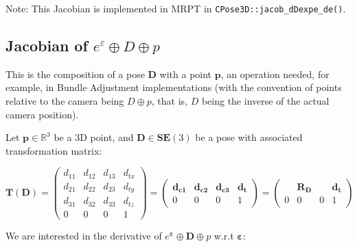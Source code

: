 \documentclass[a4paper,11pt]{report}
\newcommand{\E}{{\bm{\varepsilon}}}
\begin{document}
Note: This Jacobian is implemented in MRPT in \texttt{CPose3D::jacob\_dDexpe\_de()}.


\subsection{Jacobian of $e^\varepsilon \oplus D \oplus p$}
\label{sect:jacob_eDp}

This is the composition of a pose $\mathbf{D}$ with a point $\mathbf{p}$,
an operation needed, for example, in Bundle Adjustment implementations \cite{triggs2000bundle}
(with the convention of points relative to the camera being $D \oplus p$, that is,
$D$ being the inverse of the actual camera position).

Let $\mathbf{p} \in \mathbb{R}^3$ be a 3D point, and
$\mathbf{D} \in \mathbf{SE}(3)$ be a pose with associated transformation matrix:

\begin{equation}
\mathbf{T}(\mathbf{D}) =
\left(
\begin{array}{ccc|c}
 d_{11} & d_{12} & d_{13} & d_{tx}   \\
 d_{21} & d_{22} & d_{23} & d_{ty}   \\
 d_{31} & d_{32} & d_{33} & d_{tz}   \\
\hline
  0 & 0 & 0 & 1
\end{array}
\right)
=
\left(
\begin{array}{ccc|c}
 \mathbf{d_{c1}}  & \mathbf{d_{c2}}  & \mathbf{d_{c3}}  & \mathbf{d_{t}}  \\
\hline
  0 & 0 & 0 & 1
\end{array}
\right)
=
\left(
\begin{array}{ccc|c}
   & \mathbf{R_D}  &  & \mathbf{d_{t}}  \\
\hline
  0 & 0 & 0 & 1
\end{array}
\right)
\end{equation}

We are interested in the derivative of $e^\E \oplus \mathbf{D} \oplus p$ w.r.t $\E$:
\end{document}
